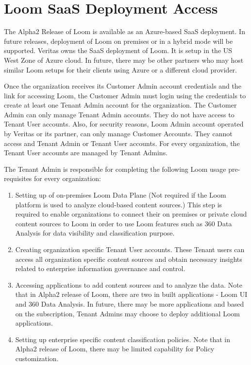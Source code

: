 \documentclass[letterpaper,10pt,english]{sphinxmanual}
\begin{document}
\chapter{Loom SaaS Deployment Access}
\label{\detokenize{loom_dep_pre_rq:loom-saas-deployment-access}}\label{\detokenize{loom_dep_pre_rq:loom-saas-dep-access}}
The Alpha2 Release of Loom is available as an Azure-based SaaS deployment.  In future releases, deployment of Loom on premises or in a hybrid mode will be supported. Veritas owns the SaaS deployment of Loom. It is setup in the US West Zone of Azure cloud. In future, there may be other partners who may host similar Loom setups for their clients using Azure or a different cloud provider.

Once the organization receives its Customer Admin account credentials and the link for accessing Loom, the Customer Admin must login using the credentials to create at least one Tenant Admin account for the organization. The Customer Admin can only manage Tenant Admin accounts. They do not have access to Tenant User accounts. Also, for security reasons, Loom Admin account operated by Veritas or its partner, can only manage Customer Accounts. They cannot access and Tenant Admin or Tenant User accounts.  For every organization, the Tenant User accounts are managed by Tenant Admins.

The Tenant Admin is responsible for completing the following Loom usage pre-requisites for every organization:
\begin{enumerate}
\item {} 
Setting up of on-premises Loom Data Plane (Not required if the Loom platform is used to analyze cloud-based content sources.)
This step is required to enable organizations to connect their on premises or private cloud content sources to Loom in order to use Loom features such as 360 Data Analysis for data visibility and classification purpose.

\item {} 
Creating organization specific Tenant User accounts. These Tenant users can access all organization specific content sources and obtain necessary insights related to enterprise information governance and control.

\item {} 
Accessing applications to add content sources and to analyze the data. Note that in Alpha2 release of Loom, there are two in built applications - Loom UI and 360 Data Analysis.  In future, there may be more applications and based on the subscription, Tenant Admins may choose to deploy additional Loom applications.

\item {} 
Setting up enterprise specific content classification policies.  Note that in Alpha2 release of Loom, there may be limited capability for Policy customization.

\end{enumerate}
\end{document}
